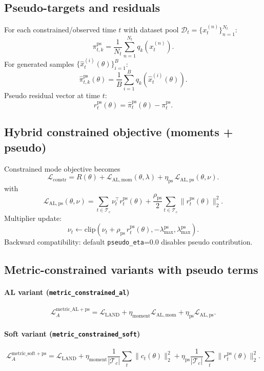 \documentclass[11pt]{article}
\begin{document}
\subsection*{Pseudo-targets and residuals}
For each constrained/observed time $t$ with dataset pool $\mathcal{D}_t=\{x_t^{(n)}\}_{n=1}^{N_t}$:
\[
\pi_{t,k}^{\mathrm{ps}}
=
\frac{1}{N_t}\sum_{n=1}^{N_t} q_k(x_t^{(n)}).
\]
For generated samples $\{\hat{x}_t^{(i)}(\theta)\}_{i=1}^{B}$:
\[
\hat{\pi}_{t,k}^{\mathrm{ps}}(\theta)
=
\frac{1}{B}\sum_{i=1}^{B} q_k\!\left(\hat{x}_t^{(i)}(\theta)\right).
\]
Pseudo residual vector at time $t$:
\[
r_t^{\mathrm{ps}}(\theta)=\hat{\pi}_t^{\mathrm{ps}}(\theta)-\pi_t^{\mathrm{ps}}.
\]

\subsection*{Hybrid constrained objective (moments + pseudo)}
Constrained mode objective becomes
\[
\mathcal{L}_{\mathrm{constr}}
=
R(\theta)
+ \mathcal{L}_{\mathrm{AL,mom}}(\theta,\lambda)
+ \eta_{\mathrm{ps}}\,\mathcal{L}_{\mathrm{AL,ps}}(\theta,\nu).
\]
with
\[
\mathcal{L}_{\mathrm{AL,ps}}(\theta,\nu)
=
\sum_{t\in\mathcal{T}_c}\nu_t^\top r_t^{\mathrm{ps}}(\theta)
+ \frac{\rho_{\mathrm{ps}}}{2}\sum_{t\in\mathcal{T}_c}\|r_t^{\mathrm{ps}}(\theta)\|_2^2.
\]
Multiplier update:
\[
\nu_t\leftarrow
\mathrm{clip}\!\left(
\nu_t+\rho_{\mathrm{ps}}\,r_t^{\mathrm{ps}}(\theta),
-\lambda_{\max}^{\mathrm{ps}},
\lambda_{\max}^{\mathrm{ps}}
\right).
\]
Backward compatibility: default \texttt{pseudo\_eta}=0.0 disables pseudo contribution.

\subsection*{Metric-constrained variants with pseudo terms}
\paragraph{AL variant (\texttt{metric\_constrained\_al})}
\[
\mathcal{L}_{A}^{\mathrm{metric\_AL+ps}}
=
\mathcal{L}_{\mathrm{LAND}}
+ \eta_{\mathrm{moment}}\mathcal{L}_{\mathrm{AL,mom}}
+ \eta_{\mathrm{ps}}\mathcal{L}_{\mathrm{AL,ps}}.
\]
\paragraph{Soft variant (\texttt{metric\_constrained\_soft})}
\[
\mathcal{L}_{A}^{\mathrm{metric\_soft+ps}}
=
\mathcal{L}_{\mathrm{LAND}}
+ \eta_{\mathrm{moment}}\frac{1}{|\mathcal{T}_c|}\sum_t\|c_t(\theta)\|_2^2
+ \eta_{\mathrm{ps}}\frac{1}{|\mathcal{T}_c|}\sum_t\|r_t^{\mathrm{ps}}(\theta)\|_2^2.
\]
\end{document}
